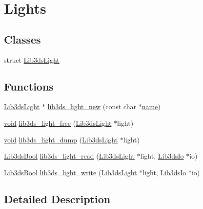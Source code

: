 \hypertarget{group__light}{\section{Lights}
\label{group__light}
}
\subsection*{Classes}
\begin{DoxyCompactItemize}
\item 
struct \hyperlink{struct_lib3ds_light}{Lib3ds\-Light}
\end{DoxyCompactItemize}
\subsection*{Functions}
\begin{DoxyCompactItemize}
\item 
\hyperlink{struct_lib3ds_light}{Lib3ds\-Light} $\ast$ \hyperlink{group__light_ga34a99c90f44e90c4725b0d82a8c1e719}{lib3ds\-\_\-light\-\_\-new} (const char $\ast$\hyperlink{glext_8h_ad977737dfc9a274a62741b9500c49a32}{name})
\item 
\hyperlink{group___u_a_v_objects_plugin_ga444cf2ff3f0ecbe028adce838d373f5c}{void} \hyperlink{group__light_ga08cf7d7204224addf8c6bce2fc00779a}{lib3ds\-\_\-light\-\_\-free} (\hyperlink{struct_lib3ds_light}{Lib3ds\-Light} $\ast$light)
\item 
\hyperlink{group___u_a_v_objects_plugin_ga444cf2ff3f0ecbe028adce838d373f5c}{void} \hyperlink{group__light_gaf9915b4c47e23a702e08b05387f2138c}{lib3ds\-\_\-light\-\_\-dump} (\hyperlink{struct_lib3ds_light}{Lib3ds\-Light} $\ast$light)
\item 
\hyperlink{types_8h_a89dd7398a9ebbbf28011f8c32df67ad3}{Lib3ds\-Bool} \hyperlink{group__light_ga7768611944b8b21437ec6e02bc651f60}{lib3ds\-\_\-light\-\_\-read} (\hyperlink{struct_lib3ds_light}{Lib3ds\-Light} $\ast$light, \hyperlink{struct_lib3ds_io}{Lib3ds\-Io} $\ast$io)
\item 
\hyperlink{types_8h_a89dd7398a9ebbbf28011f8c32df67ad3}{Lib3ds\-Bool} \hyperlink{group__light_ga58ceb7a8fe334e05c7b4240fd4835e97}{lib3ds\-\_\-light\-\_\-write} (\hyperlink{struct_lib3ds_light}{Lib3ds\-Light} $\ast$light, \hyperlink{struct_lib3ds_io}{Lib3ds\-Io} $\ast$io)
\end{DoxyCompactItemize}


\subsection{Detailed Description}


